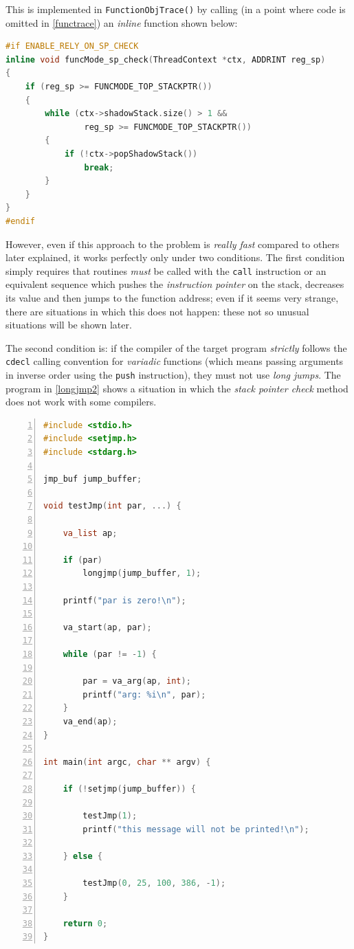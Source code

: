 \documentclass[a4paper,10pt]{report}
\begin{document}
This is implemented in \verb|FunctionObjTrace()| by calling 
(in a point where code is omitted in \cref{functrace})
an \emph{inline} function shown below:

\begin{lstlisting}[language=C++, 
	caption={implementation of \texttt{funcMode\_sp\_check()}}, 
	label=spcheck, frame=leftline, showstringspaces=false]
#if ENABLE_RELY_ON_SP_CHECK
inline void funcMode_sp_check(ThreadContext *ctx, ADDRINT reg_sp)
{
	if (reg_sp >= FUNCMODE_TOP_STACKPTR()) 
	{
		while (ctx->shadowStack.size() > 1 && 
				reg_sp >= FUNCMODE_TOP_STACKPTR()) 
		{
			if (!ctx->popShadowStack())
				break;
		}
	}
}
#endif
\end{lstlisting}

However, even if this approach to the problem is \emph{really fast} compared to others 
later explained, it works perfectly only under two conditions.
The first condition simply requires that routines \emph{must} be called with the \verb|call| instruction or an equivalent sequence which pushes the \emph{instruction pointer} 
on the stack, decreases its value and then jumps to the function address; even if it seems very strange, there are situations in which this does not happen: these not so unusual situations will be shown later.

The second condition is: if the compiler of the target program \emph{strictly}
follows the \verb|cdecl| calling convention for \emph{variadic} functions
(which means passing arguments in inverse order using the \verb|push| instruction),
they must not use \emph{long jumps}. The program in \cref{longjmp2} shows 
a situation in which the \emph{stack pointer check} method 
does not work with some compilers.

\begin{lstlisting}[language=C++, 
	caption={source code of \texttt{prog8.c}}, 
	label=longjmp2, frame=leftline, numbers=left, showstringspaces=false]
#include <stdio.h>
#include <setjmp.h>
#include <stdarg.h>

jmp_buf jump_buffer;

void testJmp(int par, ...) {

	va_list ap;

	if (par) 
		longjmp(jump_buffer, 1);

	printf("par is zero!\n");

	va_start(ap, par);

	while (par != -1) {

		par = va_arg(ap, int);
		printf("arg: %i\n", par);
	}
	va_end(ap);
}

int main(int argc, char ** argv) {

	if (!setjmp(jump_buffer)) {

		testJmp(1);
		printf("this message will not be printed!\n");
	
	} else {

		testJmp(0, 25, 100, 386, -1);
	}	

	return 0;
}
\end{lstlisting}
\end{document}
